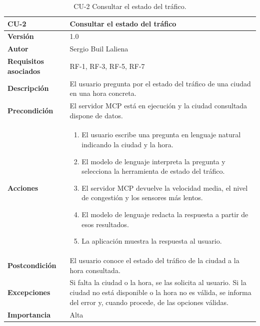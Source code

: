 \begin{table}[p]
	\centering
	\begin{tabularx}{\linewidth}{ p{} p{} }
		\toprule
		\textbf{CU-2}    & \textbf{Consultar el estado del tráfico}\\
		\toprule
		\textbf{Versión}              & 1.0    \\
		\textbf{Autor}                & Sergio Buil Laliena \\
		\textbf{Requisitos asociados} & RF-1, RF-3, RF-5, RF-7 \\
		\textbf{Descripción}          & El usuario pregunta por el estado del tráfico de una ciudad en una hora concreta. \\
		\textbf{Precondición}         & El servidor MCP está en ejecución y la ciudad consultada dispone de datos. \\
		\textbf{Acciones}             &
		\begin{enumerate}
			\def\labelenumi{\arabic{enumi}.}
			\tightlist
			\item El usuario escribe una pregunta en lenguaje natural indicando la ciudad y la hora.
			\item El modelo de lenguaje interpreta la pregunta y selecciona la herramienta de estado del tráfico.
			\item El servidor MCP devuelve la velocidad media, el nivel de congestión y los sensores más lentos.
			\item El modelo de lenguaje redacta la respuesta a partir de esos resultados.
			\item La aplicación muestra la respuesta al usuario.
		\end{enumerate}\\
		\textbf{Postcondición}        & El usuario conoce el estado del tráfico de la ciudad a la hora consultada. \\
		\textbf{Excepciones}          & Si falta la ciudad o la hora, se las solicita al usuario. Si la ciudad no está disponible o la hora no es válida, se informa del error y, cuando procede, de las opciones válidas. \\
		\textbf{Importancia}          & Alta \\
		\bottomrule
	\end{tabularx}
	\caption{CU-2 Consultar el estado del tráfico.}
	\label{tabla:cu2}
\end{table}

